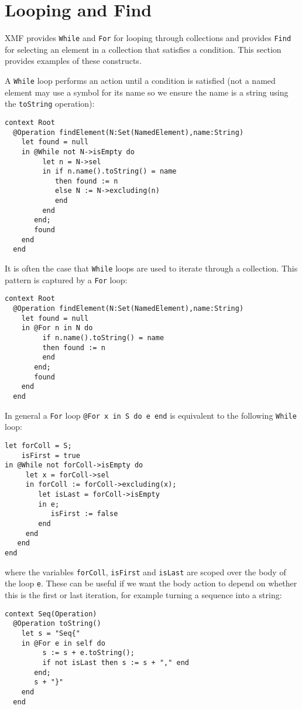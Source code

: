 \documentclass{article}
\begin{document}
\section{Looping and Find}

XMF provides {\tt While} and {\tt For} for looping through collections and provides {\tt Find} for
selecting an element in a collection that satisfies a condition. This section provides examples 
of these constructs.

A {\tt While} loop performs an action until a condition is satisfied (not a named element may use
a symbol for its name so we ensure the name is a string using the {\tt toString} operation):
\begin{verbatim}
context Root
  @Operation findElement(N:Set(NamedElement),name:String)
    let found = null
    in @While not N->isEmpty do
         let n = N->sel
         in if n.name().toString() = name
            then found := n
            else N := N->excluding(n)
            end
         end
       end;
       found
    end
  end
\end{verbatim}
It is often the case that {\tt While} loops are used to iterate through a collection. This pattern
is captured by a {\tt For} loop:
\begin{verbatim}
context Root
  @Operation findElement(N:Set(NamedElement),name:String)
    let found = null
    in @For n in N do
         if n.name().toString() = name
         then found := n
         end
       end;
       found
    end
  end
\end{verbatim} 
In general a {\tt For} loop {\tt @For x in S do e end} is equivalent to the following
{\tt While} loop:
\begin{verbatim}
let forColl = S;
    isFirst = true
in @While not forColl->isEmpty do
     let x = forColl->sel
     in forColl := forColl->excluding(x);
        let isLast = forColl->isEmpty
        in e;
           isFirst := false
        end
     end
   end
end
\end{verbatim}
where the variables {\tt forColl}, {\tt isFirst} and {\tt isLast} are scoped over the
body of the loop {\tt e}. These can be useful if we want the body action to depend on
whether this is the first or last iteration, for example turning a sequence into a 
string:
\begin{verbatim}
context Seq(Operation)
  @Operation toString()
    let s = "Seq{"
    in @For e in self do
         s := s + e.toString();
         if not isLast then s := s + "," end
       end;
       s + "}"
    end
  end
\end{verbatim}
\end{document}
